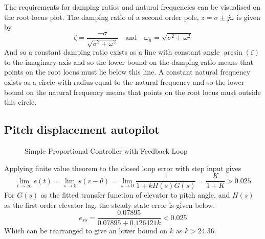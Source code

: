 \documentclass{article}
\begin{document}
The requirements for damping ratios and natural frequencies can be visualised on the root locus plot.
The damping ratio of a second order pole, $z = \sigma \pm j\omega$ is given by
\begin{equation}
    \zeta = \frac{-\sigma}{\sqrt{\sigma^2 + \omega^2}} \quad \text{and} \quad \omega_n = \sqrt{\sigma^2 + \omega^2}
\end{equation}
And so a constant damping ratio exists as a line with constant angle $\arcsin(\zeta)$ to the imaginary axis and so the lower bound on the damping ratio means that points on the root locus must lie below this line.
A constant natural frequency exists as a circle with radius equal to the natural frequency and so the lower bound on the natural frequency means that points on the root locus must outside this circle.

\subsection{Pitch displacement autopilot}

\begin{figure}[H]
    \begin{center}
    \end{center}
    \caption{Simple Proportional Controller with Feedback Loop}\label{fig}
\end{figure}

Applying finite value theorem to the closed loop error with step input gives
\begin{equation}
    \lim_{t \to \infty} e(t) = \lim_{s \to 0} s (r - \theta) = \lim_{s \to 0} \frac{1}{1+kH(s)G(s)} = \frac{K}{1+K} > 0.025
\end{equation}
For $G(s)$ as the fitted transfer function of elevator to pitch angle, and $H(s)$ as the first order elevator lag, the steady state error is given below.
\begin{equation}
    e_{ss} = \frac{0.07895}{0.07895 + 0.126421 k} < 0.025
\end{equation}
Which can be rearranged to give an lower bound on $k$ as $k > 24.36$.
\end{document}
